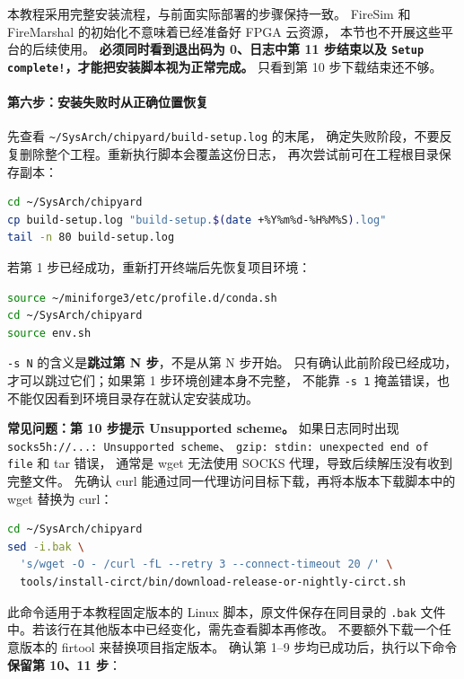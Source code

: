 本教程采用完整安装流程，与前面实际部署的步骤保持一致。
FireSim 和 FireMarshal 的初始化不意味着已经准备好 FPGA 云资源，
本节也不开展这些平台的后续使用。
\textbf{必须同时看到退出码为 0、日志中第 11 步结束以及
\lstinline|Setup complete!|，才能把安装脚本视为正常完成。}
只看到第 10 步下载结束还不够。

\paragraph{第六步：安装失败时从正确位置恢复}
先查看 \lstinline|~/SysArch/chipyard/build-setup.log| 的末尾，
确定失败阶段，不要反复删除整个工程。重新执行脚本会覆盖这份日志，
再次尝试前可在工程根目录保存副本：

\begin{lstlisting}[language=bash]
cd ~/SysArch/chipyard
cp build-setup.log "build-setup.$(date +%Y%m%d-%H%M%S).log"
tail -n 80 build-setup.log
\end{lstlisting}

若第 1 步已经成功，重新打开终端后先恢复项目环境：

\begin{lstlisting}[language=bash]
source ~/miniforge3/etc/profile.d/conda.sh
cd ~/SysArch/chipyard
source env.sh
\end{lstlisting}

\lstinline|-s N| 的含义是\textbf{跳过第 N 步}，不是从第 N 步开始。
只有确认此前阶段已经成功，才可以跳过它们；如果第 1 步环境创建本身不完整，
不能靠 \lstinline|-s 1| 掩盖错误，也不能仅因看到环境目录存在就认定安装成功。

\textbf{常见问题：第 10 步提示 Unsupported scheme。}
如果日志同时出现 \lstinline|socks5h://...: Unsupported scheme|、
\lstinline|gzip: stdin: unexpected end of file| 和 tar 错误，
通常是 wget 无法使用 SOCKS 代理，导致后续解压没有收到完整文件。
先确认 curl 能通过同一代理访问目标下载，再将本版本下载脚本中的 wget
替换为 curl：

\begin{lstlisting}[language=bash]
cd ~/SysArch/chipyard
sed -i.bak \
  's/wget -O - /curl -fL --retry 3 --connect-timeout 20 /' \
  tools/install-circt/bin/download-release-or-nightly-circt.sh
\end{lstlisting}

此命令适用于本教程固定版本的 Linux 脚本，原文件保存在同目录的
\lstinline|.bak| 文件中。若该行在其他版本中已经变化，需先查看脚本再修改。
不要额外下载一个任意版本的 firtool 来替换项目指定版本。
确认第 1--9 步均已成功后，执行以下命令\textbf{保留第 10、11 步}：


